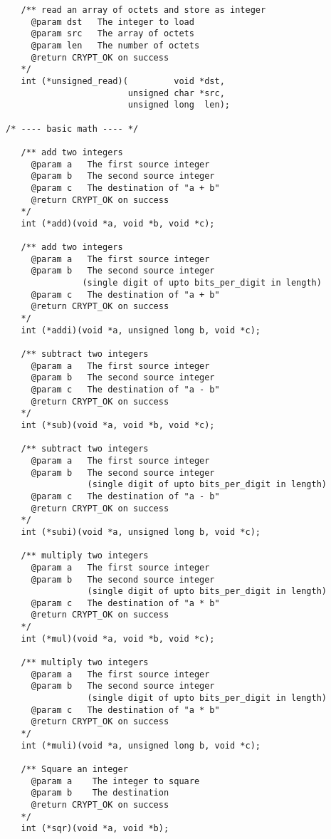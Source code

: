 \documentclass[synpaper]{book}
\begin{document}
\begin{small}
\begin{verbatim}
   /** read an array of octets and store as integer
     @param dst   The integer to load
     @param src   The array of octets 
     @param len   The number of octets 
     @return CRYPT_OK on success
   */
   int (*unsigned_read)(         void *dst, 
                        unsigned char *src, 
                        unsigned long  len);

/* ---- basic math ---- */

   /** add two integers 
     @param a   The first source integer
     @param b   The second source integer
     @param c   The destination of "a + b"
     @return CRYPT_OK on success
   */
   int (*add)(void *a, void *b, void *c);

   /** add two integers 
     @param a   The first source integer
     @param b   The second source integer 
               (single digit of upto bits_per_digit in length)
     @param c   The destination of "a + b"
     @return CRYPT_OK on success
   */
   int (*addi)(void *a, unsigned long b, void *c);

   /** subtract two integers 
     @param a   The first source integer
     @param b   The second source integer
     @param c   The destination of "a - b"
     @return CRYPT_OK on success
   */
   int (*sub)(void *a, void *b, void *c);

   /** subtract two integers 
     @param a   The first source integer
     @param b   The second source integer 
                (single digit of upto bits_per_digit in length)
     @param c   The destination of "a - b"
     @return CRYPT_OK on success
   */
   int (*subi)(void *a, unsigned long b, void *c);

   /** multiply two integers 
     @param a   The first source integer
     @param b   The second source integer 
                (single digit of upto bits_per_digit in length)
     @param c   The destination of "a * b"
     @return CRYPT_OK on success
   */
   int (*mul)(void *a, void *b, void *c);

   /** multiply two integers 
     @param a   The first source integer
     @param b   The second source integer 
                (single digit of upto bits_per_digit in length)
     @param c   The destination of "a * b"
     @return CRYPT_OK on success
   */
   int (*muli)(void *a, unsigned long b, void *c);

   /** Square an integer
     @param a    The integer to square
     @param b    The destination
     @return CRYPT_OK on success
   */
   int (*sqr)(void *a, void *b);


\end{verbatim}
\end{small}
\end{document}
